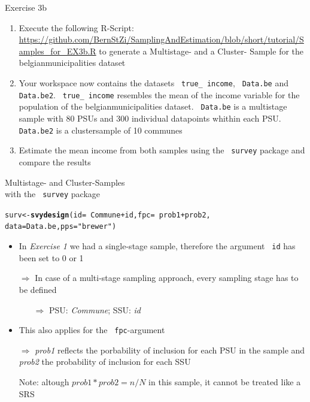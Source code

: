 \documentclass[11pt,german,hideothersubsections]{beamer}\usepackage[]{graphicx}\usepackage[]{color}
\makeatletter
\newcommand{\hlstr}[1]{\textcolor[rgb]{0.192,0.494,0.8}{#1}}%
\newcommand{\hlopt}[1]{\textcolor[rgb]{0,0,0}{#1}}%
\newcommand{\hlstd}[1]{\textcolor[rgb]{0.345,0.345,0.345}{#1}}%
\newcommand{\hlkwb}[1]{\textcolor[rgb]{0.69,0.353,0.396}{#1}}%
\newcommand{\hlkwc}[1]{\textcolor[rgb]{0.333,0.667,0.333}{#1}}%
\newcommand{\hlkwd}[1]{\textcolor[rgb]{0.737,0.353,0.396}{\textbf{#1}}}%
\newenvironment{kframe}{%
 \def\at@end@of@kframe{}%
 \ifinner\ifhmode%
  \def\at@end@of@kframe{\end{minipage}}%
  \begin{minipage}{\columnwidth}%
 \fi\fi%
 \def\FrameCommand##1{\hskip\@totalleftmargin \hskip-\fboxsep
 \colorbox{shadecolor}{##1}\hskip-\fboxsep
     \hskip-\linewidth \hskip-\@totalleftmargin \hskip\columnwidth}%
 \MakeFramed {\advance\hsize-\width
   \@totalleftmargin\z@ \linewidth\hsize
   \@setminipage}}%
 {\par\unskip\endMakeFramed%
 \at@end@of@kframe}
\newenvironment{knitrout}{}{} %
\newcommand{\R}[1]{{\tt \color{blue}  #1}}
\makeatother
\begin{document}
\begin{frame}[fragile]{Exercise 3b}

\begin{enumerate}
\item Execute the following R-Script: \url{https://github.com/BernStZi/SamplingAndEstimation/blob/short/tutorial/Samples_for_EX3b.R} to generate a Multistage- and a Cluster- Sample for the belgianmunicipalities dataset
\item Your workspace now contains the datasets \R{true\_ income}, \R{Data.be} and \R{Data.be2}. \R{true\_ income} resembles the  mean of the income variable for the population of the belgianmunicipalities dataset. \R{Data.be} is a multistage sample with 80 PSUs and 300 individual datapoints whithin each PSU. \R{Data.be2} is a clustersample of 10 communes
\item Estimate the mean income from both samples using the \R{survey} package and compare the results



\end{enumerate}


\end{frame}
\begin{frame}[fragile]{Multistage- and Cluster-Samples \\ with the \R{survey} package}

\begin{knitrout}
\color{fgcolor}\begin{kframe}
\begin{alltt}
\hlstd{surv} \hlkwb{<-} \hlkwd{svydesign}\hlstd{(}\hlkwc{id}\hlstd{=}\hlopt{~}\hlstd{Commune}\hlopt{+}\hlstd{id,}\hlkwc{fpc}\hlstd{=}\hlopt{~}\hlstd{prob1}\hlopt{+}\hlstd{prob2,}
                  \hlkwc{data}\hlstd{=Data.be,}\hlkwc{pps}\hlstd{=}\hlstr{"brewer"}\hlstd{)}
\end{alltt}
\end{kframe}
\end{knitrout}
\footnotesize{
\begin{itemize}
\item In \emph{Exercise 1} we had a single-stage sample, therefore the argument \R{id} has been set to 0 or 1
\item[$\Rightarrow$] In case of a multi-stage sampling approach, every sampling stage has to be defined
\begin{itemize}
\item[$\Rightarrow$] PSU: \emph{Commune}; SSU: \emph{id}
\end{itemize}
\item This also applies for the \R{fpc}-argument 
\item[$\Rightarrow$] \emph{prob1} reflects the porbability of inclusion for each PSU in the sample and \emph{prob2} the probability of inclusion for each SSU
\item[] \alert{Note:} altough $prob1*prob2=n/N$ in this sample, it cannot be treated like a SRS

\end{itemize}
}


\end{frame}
\end{document}
